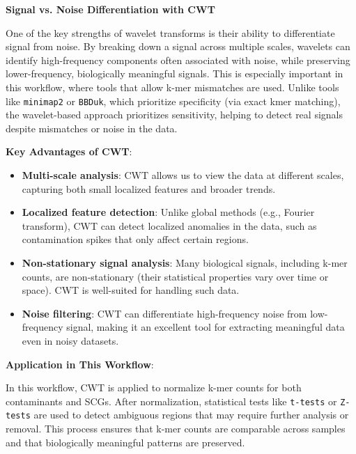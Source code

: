 \documentclass[11pt]{report}
\begin{document}
{\begin{tcolorbox}[label=box:Wavelets, colback=gray!10!white, coltitle=white, colframe=gray!80!black, title=Box on Wavelets, breakable]
	\textbf{Signal vs. Noise Differentiation with CWT}
	
	One of the key strengths of wavelet transforms is their ability to differentiate signal from noise. By breaking down a signal across multiple scales, wavelets can identify high-frequency components often associated with noise, while preserving lower-frequency, biologically meaningful signals. This is especially important in this workflow, where tools that allow k-mer mismatches are used. Unlike tools like \texttt{minimap2} or \texttt{BBDuk}, which prioritize specificity (via exact kmer matching), the wavelet-based approach prioritizes sensitivity, helping to detect real signals despite mismatches or noise in the data.
	
	\textbf{Key Advantages of CWT}:
	\begin{itemize}
		\item \textbf{Multi-scale analysis}: CWT allows us to view the data at different scales, capturing both small localized features and broader trends.
		\item \textbf{Localized feature detection}: Unlike global methods (e.g., Fourier transform), CWT can detect localized anomalies in the data, such as contamination spikes that only affect certain regions.
		\item \textbf{Non-stationary signal analysis}: Many biological signals, including k-mer counts, are non-stationary (their statistical properties vary over time or space). CWT is well-suited for handling such data.
		\item \textbf{Noise filtering}: CWT can differentiate high-frequency noise from low-frequency signal, making it an excellent tool for extracting meaningful data even in noisy datasets.
	\end{itemize}
	
	\textbf{Application in This Workflow}:
	
	In this workflow, CWT is applied to normalize k-mer counts for both contaminants and SCGs. After normalization, statistical tests like \texttt{t-tests} or \texttt{Z-tests} are used to detect ambiguous regions that may require further analysis or removal. This process ensures that k-mer counts are comparable across samples and that biologically meaningful patterns are preserved.
	
\end{tcolorbox}





\setcounter{section}{1}
\setcounter{subsection}{0}


}
\end{document}
